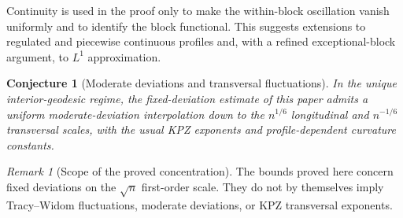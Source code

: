 \documentclass[11pt]{article}
\newtheorem{conjecture}[theorem]{Conjecture}
\theoremstyle{remark}
\newtheorem{remark}[theorem]{Remark}
\begin{document}
Continuity is used in the proof only to make the within-block oscillation
vanish uniformly and to identify the block functional.  This suggests
extensions to regulated and piecewise continuous profiles and, with a refined
exceptional-block argument, to $L^1$ approximation.

\begin{conjecture}[Moderate deviations and transversal fluctuations]
\label{conj:moderate}
In the unique interior-geodesic regime, the fixed-deviation estimate of this
paper admits a uniform moderate-deviation interpolation down to the
$n^{1/6}$ longitudinal and $n^{-1/6}$ transversal scales, with the usual KPZ
exponents and profile-dependent curvature constants.
\end{conjecture}

\begin{remark}[Scope of the proved concentration]
The bounds proved here concern fixed deviations on the $\sqrt n$ first-order
scale.  They do not by themselves imply Tracy--Widom fluctuations, moderate
deviations, or KPZ transversal exponents.
\end{remark}
\end{document}
